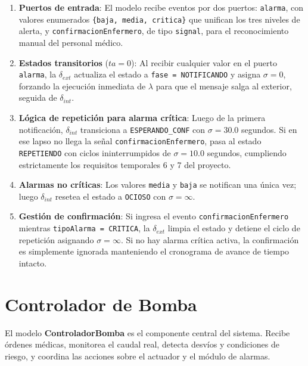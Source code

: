 \documentclass[12pt, a4paper]{article}
\begin{document}
\begin{enumerate}
    \item \textbf{Puertos de entrada}: El modelo recibe eventos por dos puertos:
    \texttt{alarma}, con valores enumerados \texttt{\{baja, media, critica\}} que
    unifican los tres niveles de alerta, y \texttt{confirmacionEnfermero}, de tipo
    \texttt{signal}, para el reconocimiento manual del personal médico.

    \item \textbf{Estados transitorios} ($ta = 0$): Al recibir cualquier valor en
    el puerto \texttt{alarma}, la $\delta_{\mathit{ext}}$ actualiza el estado a
    \texttt{fase = NOTIFICANDO} y asigna $\sigma = 0$, forzando la ejecución inmediata
    de $\lambda$ para que el mensaje salga al exterior, seguida de $\delta_{\mathit{int}}$.

    \item \textbf{Lógica de repetición para alarma crítica}: Luego de la primera
    notificación, $\delta_{\mathit{int}}$ transiciona a \texttt{ESPERANDO\_CONF}
    con $\sigma = 30.0$ segundos. Si en ese lapso no llega la señal \texttt{confirmacionEnfermero}, pasa al estado \texttt{REPETIENDO} con ciclos ininterrumpidos de $\sigma = 10.0$ segundos, cumpliendo estrictamente los requisitos temporales 6 y 7 del proyecto.

    \item \textbf{Alarmas no críticas}: Los valores \texttt{media} y \texttt{baja} se notifican una única vez; luego $\delta_{\mathit{int}}$ resetea el estado a \texttt{OCIOSO} con $\sigma = \infty$.

    \item \textbf{Gestión de confirmación}: Si ingresa el evento \texttt{confirmacionEnfermero} 
      mientras \texttt{tipoAlarma = CRITICA}, la $\delta_{\mathit{ext}}$ limpia el 
      estado y detiene el ciclo de repetición asignando $\sigma = \infty$. Si no hay alarma crítica activa, la confirmación es simplemente ignorada manteniendo el cronograma de avance de tiempo intacto.
\end{enumerate}
\section{Controlador de Bomba}

El modelo \textbf{ControladorBomba} es el componente central del sistema. Recibe
órdenes médicas, monitorea el caudal real, detecta desvíos y condiciones de riesgo,
y coordina las acciones sobre el actuador y el módulo de alarmas.
\end{document}

